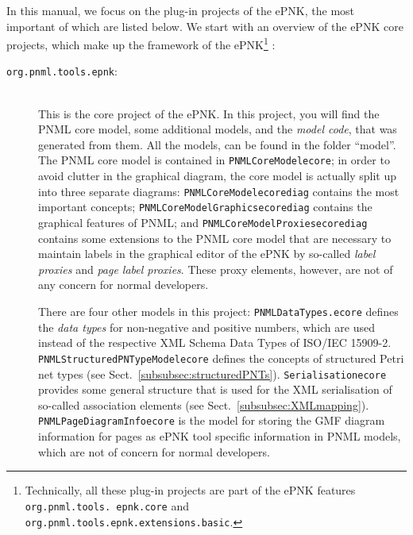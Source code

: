 In this manual, we focus on the plug-in projects of the ePNK, the most important
of which are listed below. We start with an overview of the ePNK core projects,
which make up the framework of the ePNK\footnote
  {Technically, all these plug-in projects are part of the ePNK features
   {\tt org.pnml.tools. epnk.core}  and
   {\tt org.pnml.tools.epnk.extensions.basic}.}%
:
\begin{description}
  \item[{\tt org.pnml.tools.epnk}:] ~\\
  This is the core project of the ePNK. In
  this project, you will find the PNML core model, some additional models, and the
    \emph{model code}, that was generated from them. All the models, can be
    found in the folder ``model''. The PNML core model is contained in
    {\tt PNMLCoreModel\qnsep{}ecore};%
    in order to avoid clutter in the graphical
    diagram, the core model is actually split up into three separate diagrams:
    {\tt PNMLCore\optsep{}Model\qnsep{}ecorediag} contains the most important
    concepts; {\tt PNMLCore\optsep{}Model\optsep{}Graphics\qnsep{}ecorediag}
    contains the graphical features of PNML; and {\tt PNMLCoreModelProxies\qnsep{}ecorediag} contains some extensions
    to the PNML core model that are necessary to maintain labels in the
    graphical editor of the ePNK by so-called \emph{label proxies}%
    and \emph{page label proxies}.%
   These proxy elements, however, are not of any concern for normal developers.

    There are four other models in this project: {\tt PNMLDataTypes.ecore}
    defines the \emph{data types}%
    for non-negative and positive numbers, which are used instead of the
    respective XML Schema Data Types of ISO/IEC 15909-2. {\tt
    PNMLStructuredPNTypeModel\qnsep{}ecore} defines the concepts of structured
    Petri net types%
    (see Sect.~\ref{subsubsec:structuredPNTs}).
    {\tt Serialisation\qnsep{}ecore} provides some general structure that is
    used for the XML serialisation of so-called association elements%
    (see Sect.~\ref{subsubsec:XMLmapping}).
    {\tt PNMLPageDiagram\optsep{}Info\qnsep{}ecore} is the model for storing the
    GMF diagram information%
    for pages as ePNK tool specific information in PNML models, which are not of
    concern for normal developers.
    

\end{description}
